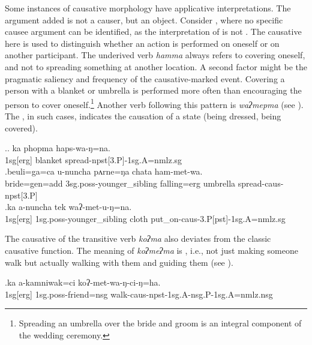 Some instances of causative morphology have applicative interpretations. The argument added is not a causer, but an object. Consider \Next, where no specific causee argument can be identified, as the interpretation of \Next[b] is not . The causative here is used to distinguish whether an action is performed on oneself or on another participant. The underived verb \emph{hamma}  always refers to covering oneself, and not to spreading something at another location. A second factor might be the pragmatic saliency and frequency of the causative-marked event. Covering a person with a blanket or umbrella is performed more often than encouraging the person to cover oneself.\footnote{Spreading an umbrella over the bride and groom is an integral component of the wedding ceremony.} Another verb following this pattern is  \emph{waʔmepma}  (see \Next[c]). The , in such cases, indicates the causation of a state (being dressed, being covered).  


\ex.\ag. ka phopma haps-wa-ŋ=na.\\ 
{\sc 1sg[erg]} blanket spread{\sc -npst[3.P]-1sg.A=nmlz.sg}\\
\bg.beuli=ga=ca  u-nuncha pʌrne=ŋa   chata    ham-met-wa.\\
bride{\sc =gen=add} {\sc 3sg.poss-}younger\_sibling falling{\sc =erg} umbrella spread{\sc -caus-npst[3.P]}\\
  
\bg.ka a-nuncha tek waʔ-met-u-ŋ=na.\\
{\sc 1sg[erg]}  {\sc 1sg.poss-}younger\_sibling cloth put\_on{\sc -caus-3.P[pst]-1sg.A=nmlz.sg}\\

\newpage
The causative of the transitive verb \emph{koʔma}  also deviates  from the classic causative function. The meaning of \emph{koʔmeʔma} is , i.e., not just making someone walk but actually walking with them and guiding them (see \Next). 

\exg.ka a-kamniwak=ci  koʔ-met-wa-ŋ-ci-ŋ=ha.\\
{\sc 1sg[erg]}  {\sc 1sg.poss-}friend{\sc =nsg} walk{\sc -caus-npst-1sg.A-nsg.P-1sg.A=nmlz.nsg} \\
 
